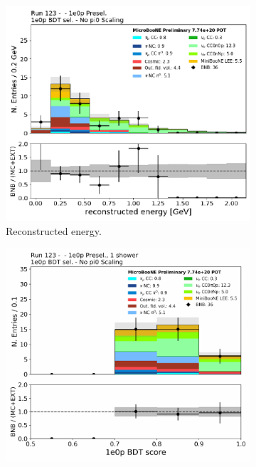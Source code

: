 \begin{figure}[H] 
\begin{center}
    \begin{subfigure}[b]{0.3\textwidth}
    \centering
    \includegraphics[width=1.00\textwidth]{Fakedata/set3/zp_postsel_recoe.pdf}
    \caption{\label{fig:fakedata:set3:zp_postsel_recoe} Reconstructed energy.}
    \end{subfigure}
    \begin{subfigure}[b]{0.3\textwidth}
    \centering
    \includegraphics[width=1.00\textwidth]{Fakedata/set3/zp_postsel_bdt.pdf}

\end{subfigure}
\end{center}
\end{figure}
